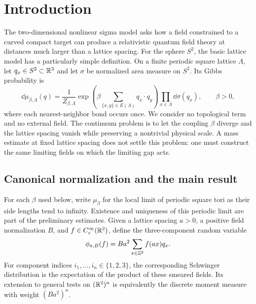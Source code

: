 \section{Introduction}\label{sec:introduction}

The two-dimensional nonlinear sigma model asks how a field constrained to
a curved compact target can produce a relativistic quantum field theory
at distances much larger than a lattice spacing. For the sphere $S^2$, the
basic lattice model has a particularly simple definition. On a finite
periodic square lattice $\Lambda$, let $q_x\in S^2\subset\mathbb R^3$ and let
$\sigma$ be normalized area measure on $S^2$. Its Gibbs probability is
\begin{equation}\label{eq:lattice-model}
 \dd\mu_{\beta,\Lambda}(q)
 =\frac{1}{Z_{\beta,\Lambda}}
   \exp\!\left(\beta\sum_{\{x,y\}\in E(\Lambda)}q_x\cdot q_y\right)
   \prod_{x\in\Lambda}\dd\sigma(q_x),
 \qquad \beta>0,
\end{equation}
where each nearest-neighbor bond occurs once. We consider no topological
term and no external field. The continuum problem is to let the coupling
$\beta$ diverge and the lattice spacing vanish while preserving a
nontrivial physical scale. A mass estimate at fixed lattice spacing does
not settle this problem: one must construct the same limiting fields on
which the limiting gap acts.



\subsection{Canonical normalization and the main result}

For each $\beta$ used below, write $\mu_\beta$ for the local limit of
periodic square tori as their side lengths tend to infinity. Existence and
uniqueness of this periodic limit are part of the preliminary estimates.
Given a lattice spacing $a>0$, a positive field normalization $B$, and
$f\in C_c^\infty(\mathbb R^2)$, define the three-component random variable
\[
 \phi_{a,B}(f)=Ba^2\sum_{x\in\mathbb Z^2}f(ax)q_x.
\]
For component indices $i_1,\ldots,i_n\in\{1,2,3\}$, the corresponding
Schwinger distribution is the expectation of the product of these
smeared fields. Its extension to general tests on $(\mathbb R^2)^n$ is equivalently
the discrete moment measure with weight $(Ba^2)^n$.

